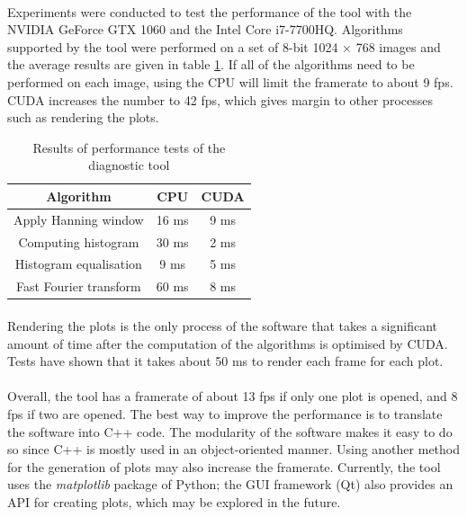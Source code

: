 \documentclass[12pt, twocolumn]{report}
\begin{document}
\paragraph{}
Experiments were conducted to test the performance of the tool with the NVIDIA GeForce GTX 1060 and the Intel Core i7-7700HQ. Algorithms supported by the tool were performed on a set of 8-bit 1024 $\times$ 768 images and the average results are given in table \ref{Software performance test}. If all of the algorithms need to be performed on each image, using the CPU will limit the framerate to about 9 fps. CUDA increases the number to 42 fps, which gives margin to other processes such as rendering the plots.

\begin{table}[htbp]
    \caption{Results of performance tests of the diagnostic tool}
    \begin{center}
    \begin{tabular}{|c|c|c|}
    \hline
    \textbf{Algorithm} & \textbf{CPU} & \textbf{CUDA} \\
    \hline
    Apply Hanning window & 16 ms & 9 ms \\
    \hline
    Computing histogram & 30 ms & 2 ms \\
    \hline
    Histogram equalisation & 9 ms & 5 ms \\
    \hline
    Fast Fourier transform & 60 ms & 8 ms \\
    \hline
    \end{tabular}
    \label{Software performance test}
    \end{center}
\end{table}

\paragraph{}
Rendering the plots is the only process of the software that takes a significant amount of time after the computation of the algorithms is optimised by CUDA. Tests have shown that it takes about 50 ms to render each frame for each plot.

\paragraph{}
Overall, the tool has a framerate of about 13 fps if only one plot is opened, and 8 fps if two are opened. The best way to improve the performance is to translate the software into C++ code. The modularity of the software makes it easy to do so since C++ is mostly used in an object-oriented manner. Using another method for the generation of plots may also increase the framerate. Currently, the tool uses the \textit{matplotlib} package of Python; the GUI framework (Qt) also provides an API for creating plots, which may be explored in the future.
\end{document}
